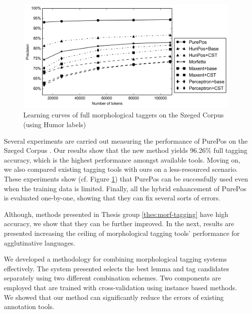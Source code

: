 \begin{figure}[H]
  \centering
  \includegraphics[width=1\textwidth]{MorphTagging/msd_token.png}
  \caption{Learning curves of full morphological taggers on the Szeged Corpus (using Humor labels)}
  \label{fig:humor-token_en}
\end{figure}

Several experiments are carried out measuring the performance of PurePos on the Szeged Corpus \cite{Csendes2004}.
Our results show that the new method yields 96.26\% full tagging accuracy, which is the highest performance amongst available tools.
Moving on, we also compared existing tagging tools with ours on a less-resourced scenario.
These experiments show (cf. Figure \ref{fig:humor-token_en}) that PurePos can be successfully used even when the training data is limited.
Finally, all the hybrid enhancement of PurePos is evaluated one-by-one, showing that they can fix several sorts of errors.


\thesisline%

Although, methods presented in Thesis group \ref{thes:morf-tagging} have high accuracy, we show that they can be further improved.  
In the next, results are presented increasing the ceiling of morphological tagging tools' performance for agglutinative languages.


\begin{core}
\begin{thesis}
We developed a methodology for combining morphological tagging systems effectively.
The system presented selects the best lemma and tag candidates separately using two different combination schemes.
Two components are employed that are trained with cross-validation using instance based methods.
We showed that our method can significantly reduce the errors of existing annotation tools.
\end{thesis}

\begin{pub}
\cite{Laki2013a,Orosz2013c,Orosz2013d} 
\end{pub}
\end{core}

